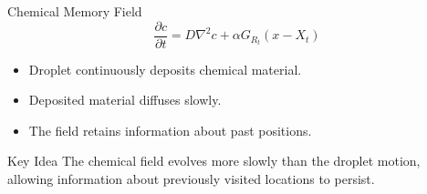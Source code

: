 







\begin{frame}{Chemical Memory Field}
	\[
		\frac{\partial c}{\partial t}
		=
		D\nabla^2 c
		+
		\alpha G_{R_t}(x-X_t)
	\]

	\begin{itemize}
		\item Droplet continuously deposits chemical material.
		\item Deposited material diffuses slowly.
		\item The field retains information about past positions.
	\end{itemize}
	\begin{alertblock}{Key Idea}
		The chemical field evolves more slowly than the droplet motion,
		allowing information about previously visited locations to persist.
	\end{alertblock}
\end{frame}

